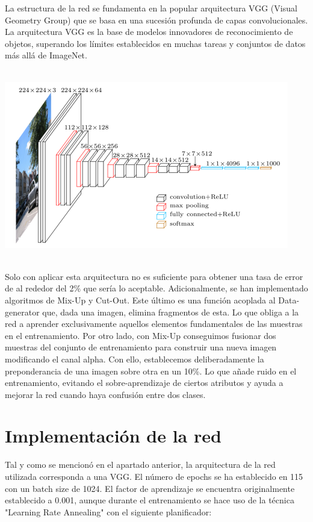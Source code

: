 \documentclass[12pt]{article}
\begin{document}
La estructura de la red se fundamenta en la popular arquitectura VGG (Visual Geometry Group) que se basa en una sucesión profunda de capas convolucionales.
La arquitectura VGG es la base de modelos innovadores de reconocimiento de objetos, superando los límites establecidos en muchas tareas y conjuntos de datos más allá de ImageNet.
\\\\
\begin{center}
    \includegraphics[scale=0.7]{vgg.png}
\end{center}
~\\
Solo con aplicar esta arquitectura no es suficiente para obtener una tasa de error de al rededor del 2\% que sería lo aceptable. Adicionalmente, se han implementado algoritmos de Mix-Up y Cut-Out. Este último es una función acoplada al Data-generator que, dada una imagen, elimina fragmentos de esta. Lo que obliga a la red a aprender exclusivamente aquellos elementos fundamentales de las muestras en el entrenamiento. Por otro lado, con Mix-Up conseguimos fusionar dos muestras del conjunto de entrenamiento para construir una nueva imagen modificando el canal alpha. Con ello, establecemos deliberadamente la preponderancia de una imagen sobre otra en un 10\%. Lo que añade ruido en el entrenamiento, evitando el sobre-aprendizaje de ciertos atributos y ayuda a mejorar la red cuando haya confusión entre dos clases. 

\newpage

\section*{Implementación de la red}

Tal y como se mencionó en el apartado anterior, la arquitectura de la red utilizada corresponda a una VGG. El número de epochs se ha establecido en 115 con un batch size de 1024. El factor de aprendizaje se encuentra originalmente establecido a 0.001, aunque durante el entrenamiento se hace uso de la técnica "Learning Rate Annealing" con el siguiente planificador:
\end{document}

